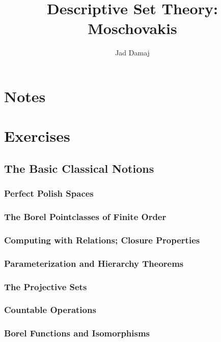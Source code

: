 \documentclass[openany]{book}
\title{Descriptive Set Theory: Moschovakis}
\author{Jad Damaj}
\date{}
\begin{document}
\maketitle

\tableofcontents

\newpage

\part{Notes}

\part{Exercises}

\chapter{The Basic Classical Notions}


\section{Perfect Polish Spaces}

\section{The Borel Pointclasses of Finite Order}

\section{Computing with Relations; Closure Properties}

\section{Parameterization and Hierarchy Theorems}

\section{The Projective Sets}

\section{Countable Operations}

\section{Borel Functions and Isomorphisms}
\end{document}

